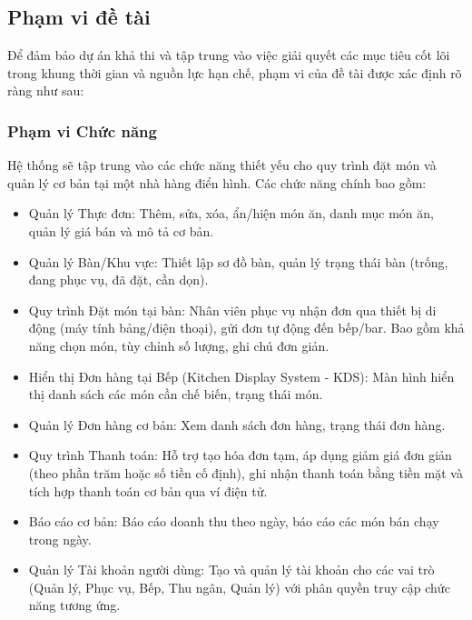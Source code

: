 

\subsection{Phạm vi đề tài}

Để đảm bảo dự án khả thi và tập trung vào việc giải quyết các mục tiêu cốt lõi trong khung thời gian và nguồn lực hạn chế, phạm vi của đề tài được xác định rõ ràng như sau:

\subsubsection{Phạm vi Chức năng}

Hệ thống sẽ tập trung vào các chức năng thiết yếu cho quy trình đặt món và quản lý cơ bản tại một nhà hàng điển hình. Các chức năng chính bao gồm:
        \begin{itemize}
            \item Quản lý Thực đơn: Thêm, sửa, xóa, ẩn/hiện món ăn, danh mục món ăn, quản lý giá bán và mô tả cơ bản.
            \item Quản lý Bàn/Khu vực: Thiết lập sơ đồ bàn, quản lý trạng thái bàn (trống, đang phục vụ, đã đặt, cần dọn).
            \item Quy trình Đặt món tại bàn: Nhân viên phục vụ nhận đơn qua thiết bị di động (máy tính bảng/điện thoại), gửi đơn tự động đến bếp/bar. Bao gồm khả năng chọn món, tùy chỉnh số lượng, ghi chú đơn giản.
            \item Hiển thị Đơn hàng tại Bếp (Kitchen Display System - KDS): Màn hình hiển thị danh sách các món cần chế biến, trạng thái món.
            \item Quản lý Đơn hàng cơ bản: Xem danh sách đơn hàng, trạng thái đơn hàng.
            \item Quy trình Thanh toán: Hỗ trợ tạo hóa đơn tạm, áp dụng giảm giá đơn giản (theo phần trăm hoặc số tiền cố định), ghi nhận thanh toán bằng tiền mặt và tích hợp thanh toán cơ bản qua ví điện tử.
            \item Báo cáo cơ bản: Báo cáo doanh thu theo ngày, báo cáo các món bán chạy trong ngày.
            \item Quản lý Tài khoản người dùng: Tạo và quản lý tài khoản cho các vai trò (Quản lý, Phục vụ, Bếp, Thu ngân, Quản lý) với phân quyền truy cập chức năng tương ứng.
        \end{itemize}

